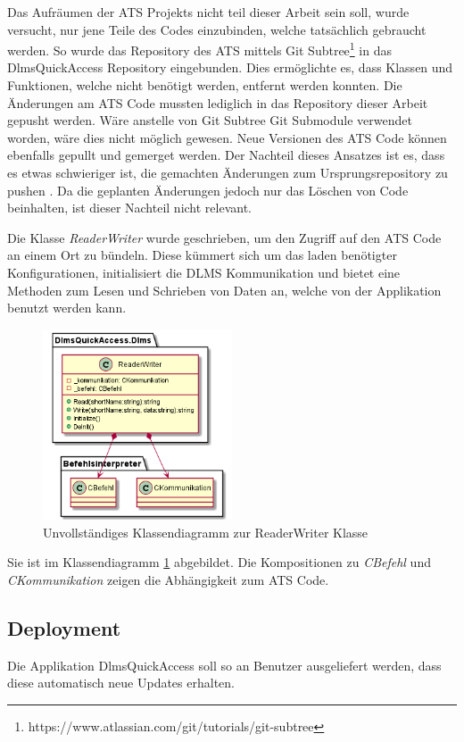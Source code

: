Das Aufräumen der \ac{ATS} Projekts nicht teil dieser Arbeit sein soll, wurde versucht, nur jene Teile des Codes einzubinden, welche tatsächlich gebraucht werden.
So wurde das Repository des \ac{ATS} mittels Git Subtree\footnote{https://www.atlassian.com/git/tutorials/git-subtree} in das DlmsQuickAccess Repository eingebunden. 
Dies ermöglichte es, dass Klassen und Funktionen, welche nicht benötigt werden, entfernt werden konnten.
Die Änderungen am \ac{ATS} Code mussten lediglich in das Repository dieser Arbeit gepusht werden.
Wäre anstelle von Git Subtree Git Submodule verwendet worden, wäre dies nicht möglich gewesen.
Neue Versionen des \ac{ATS} Code können ebenfalls gepullt und gemerget werden. 
Der Nachteil dieses Ansatzes ist es, dass es etwas schwieriger ist, die gemachten Änderungen zum Ursprungsrepository zu pushen \parencite{gitSubtree}.
Da die geplanten Änderungen jedoch nur das Löschen von Code beinhalten, ist dieser Nachteil nicht relevant.

Die Klasse \textit{ReaderWriter} wurde geschrieben, um den Zugriff auf den \ac{ATS} Code an einem Ort zu bündeln.
Diese kümmert sich um das laden benötigter Konfigurationen, initialisiert die \ac{DLMS} Kommunikation und bietet eine Methoden zum Lesen und Schrieben von Daten an, welche von der Applikation benutzt werden kann.
\begin{figure}[H]
   \centering
   \includegraphics[width=0.5\textwidth]{gfx/readerwriter.png}
   \caption{
      Unvollständiges Klassendiagramm zur ReaderWriter Klasse
      }
      \label{fig:readerwriter}
\end{figure}
Sie ist im Klassendiagramm \ref{fig:readerwriter} abgebildet.
Die Kompositionen zu \textit{CBefehl} und \textit{CKommunikation} zeigen die Abhängigkeit zum \ac{ATS} Code.



\subsection{Deployment}
\dq Die Applikation DlmsQuickAccess soll so an Benutzer ausgeliefert werden, dass diese automatisch neue Updates erhalten.\dq

